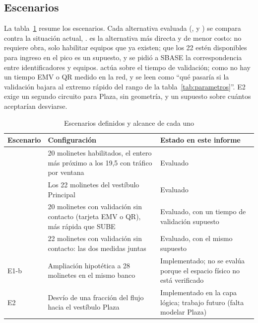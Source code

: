 \subsection{Escenarios}

La tabla~\ref{tab:escenarios} resume los escenarios. Cada alternativa evaluada (\EI{}, \ET{} y \EIT{}) se
compara contra la situación actual, \EO{}. \EI{} es la alternativa más directa y de menor costo: no requiere
obra, solo habilitar equipos que ya existen; que los 22 estén disponibles para ingreso en el pico es un
supuesto, y se pidió a SBASE la correspondencia entre identificadores y equipos. \ET{} actúa sobre el tiempo
de validación; como no hay un tiempo EMV o QR medido en la red, \ET{} y \EIT{} se leen como \enquote{qué
pasaría si la validación bajara al extremo rápido del rango de la tabla~\ref{tab:parametros}}. E2 exige un
segundo circuito para Plaza, sin geometría, y un supuesto sobre cuántos aceptarían desviarse.

\begin{table}[H]
\centering
\caption{Escenarios definidos y alcance de cada uno}
\label{tab:escenarios}
\small
\begin{tabularx}{\textwidth}{@{}l X X@{}}
\toprule
Escenario & Configuración & Estado en este informe \\
\midrule
\EO{} & 20 molinetes habilitados, el entero más próximo a los 19,5 con tráfico por ventana & Evaluado \\
\EI{} & Los 22 molinetes del vestíbulo Principal & Evaluado \\
\ET{} & 20 molinetes con validación sin contacto (tarjeta EMV o QR), más rápida que SUBE & Evaluado, con un tiempo de validación supuesto \\
\EIT{} & 22 molinetes con validación sin contacto: las dos medidas juntas & Evaluado, con el mismo supuesto \\
E1-b & Ampliación hipotética a 28 molinetes en el mismo banco & Implementado; no se evalúa porque el espacio físico no está verificado \\
E2 & Desvío de una fracción del flujo hacia el vestíbulo Plaza & Implementado en la capa lógica; trabajo futuro (falta modelar Plaza) \\
\bottomrule
\end{tabularx}
\end{table}
